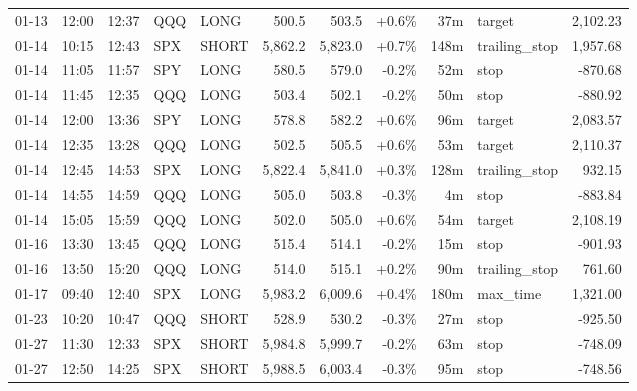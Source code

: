 \documentclass[11pt,a4paper,twoside]{article}
\begin{document}
\begin{center}
\begin{longtable}{>{\color{txtmain}}l l l l l r r r r >{\color{txtmain}}l r}
01-13 & 12:00 & 12:37 & QQQ & LONG & 500.5 & 503.5 & \textcolor{wingreen}{+0.6\%} & 37m & target & \textcolor{wingreen}{2,102.23} \\
01-14 & 10:15 & 12:43 & SPX & SHORT & 5,862.2 & 5,823.0 & \textcolor{wingreen}{+0.7\%} & 148m & trailing\_stop & \textcolor{wingreen}{1,957.68} \\
01-14 & 11:05 & 11:57 & SPY & LONG & 580.5 & 579.0 & \textcolor{lossred}{-0.2\%} & 52m & stop & \textcolor{lossred}{-870.68} \\
01-14 & 11:45 & 12:35 & QQQ & LONG & 503.4 & 502.1 & \textcolor{lossred}{-0.2\%} & 50m & stop & \textcolor{lossred}{-880.92} \\
01-14 & 12:00 & 13:36 & SPY & LONG & 578.8 & 582.2 & \textcolor{wingreen}{+0.6\%} & 96m & target & \textcolor{wingreen}{2,083.57} \\
01-14 & 12:35 & 13:28 & QQQ & LONG & 502.5 & 505.5 & \textcolor{wingreen}{+0.6\%} & 53m & target & \textcolor{wingreen}{2,110.37} \\
01-14 & 12:45 & 14:53 & SPX & LONG & 5,822.4 & 5,841.0 & \textcolor{wingreen}{+0.3\%} & 128m & trailing\_stop & \textcolor{wingreen}{932.15} \\
01-14 & 14:55 & 14:59 & QQQ & LONG & 505.0 & 503.8 & \textcolor{lossred}{-0.3\%} & 4m & stop & \textcolor{lossred}{-883.84} \\
01-14 & 15:05 & 15:59 & QQQ & LONG & 502.0 & 505.0 & \textcolor{wingreen}{+0.6\%} & 54m & target & \textcolor{wingreen}{2,108.19} \\
01-16 & 13:30 & 13:45 & QQQ & LONG & 515.4 & 514.1 & \textcolor{lossred}{-0.2\%} & 15m & stop & \textcolor{lossred}{-901.93} \\
01-16 & 13:50 & 15:20 & QQQ & LONG & 514.0 & 515.1 & \textcolor{wingreen}{+0.2\%} & 90m & trailing\_stop & \textcolor{wingreen}{761.60} \\
01-17 & 09:40 & 12:40 & SPX & LONG & 5,983.2 & 6,009.6 & \textcolor{wingreen}{+0.4\%} & 180m & max\_time & \textcolor{wingreen}{1,321.00} \\
01-23 & 10:20 & 10:47 & QQQ & SHORT & 528.9 & 530.2 & \textcolor{lossred}{-0.3\%} & 27m & stop & \textcolor{lossred}{-925.50} \\
01-27 & 11:30 & 12:33 & SPX & SHORT & 5,984.8 & 5,999.7 & \textcolor{lossred}{-0.2\%} & 63m & stop & \textcolor{lossred}{-748.09} \\
01-27 & 12:50 & 14:25 & SPX & SHORT & 5,988.5 & 6,003.4 & \textcolor{lossred}{-0.3\%} & 95m & stop & \textcolor{lossred}{-748.56} \\

\end{longtable}
\end{center}
\end{document}
